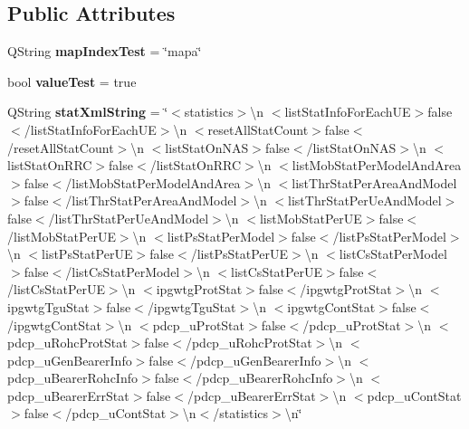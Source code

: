 \subsection*{Public Attributes}
\begin{DoxyCompactItemize}
\item 
Q\+String {\bfseries map\+Index\+Test} = \char`\"{}mapa\char`\"{}\hypertarget{class_statistics_data___test_adbae3b9a2fd94b1ab586481e3c0a6aac}{}\label{class_statistics_data___test_adbae3b9a2fd94b1ab586481e3c0a6aac}

\item 
bool {\bfseries value\+Test} = true\hypertarget{class_statistics_data___test_a870affc76bc0dce658c9f1118371ac86}{}\label{class_statistics_data___test_a870affc76bc0dce658c9f1118371ac86}

\item 
Q\+String {\bfseries stat\+Xml\+String} = \char`\"{}$<$statistics$>$\textbackslash{}n $<$list\+Stat\+Info\+For\+Each\+UE$>$false$<$/list\+Stat\+Info\+For\+Each\+UE$>$\textbackslash{}n $<$reset\+All\+Stat\+Count$>$false$<$/reset\+All\+Stat\+Count$>$\textbackslash{}n $<$list\+Stat\+On\+N\+AS$>$false$<$/list\+Stat\+On\+N\+AS$>$\textbackslash{}n $<$list\+Stat\+On\+R\+RC$>$false$<$/list\+Stat\+On\+R\+RC$>$\textbackslash{}n $<$list\+Mob\+Stat\+Per\+Model\+And\+Area$>$false$<$/list\+Mob\+Stat\+Per\+Model\+And\+Area$>$\textbackslash{}n $<$list\+Thr\+Stat\+Per\+Area\+And\+Model$>$false$<$/list\+Thr\+Stat\+Per\+Area\+And\+Model$>$\textbackslash{}n $<$list\+Thr\+Stat\+Per\+Ue\+And\+Model$>$false$<$/list\+Thr\+Stat\+Per\+Ue\+And\+Model$>$\textbackslash{}n $<$list\+Mob\+Stat\+Per\+UE$>$false$<$/list\+Mob\+Stat\+Per\+UE$>$\textbackslash{}n $<$list\+Ps\+Stat\+Per\+Model$>$false$<$/list\+Ps\+Stat\+Per\+Model$>$\textbackslash{}n $<$list\+Ps\+Stat\+Per\+UE$>$false$<$/list\+Ps\+Stat\+Per\+UE$>$\textbackslash{}n $<$list\+Cs\+Stat\+Per\+Model$>$false$<$/list\+Cs\+Stat\+Per\+Model$>$\textbackslash{}n $<$list\+Cs\+Stat\+Per\+UE$>$false$<$/list\+Cs\+Stat\+Per\+UE$>$\textbackslash{}n $<$ipgwtg\+Prot\+Stat$>$false$<$/ipgwtg\+Prot\+Stat$>$\textbackslash{}n $<$ipgwtg\+Tgu\+Stat$>$false$<$/ipgwtg\+Tgu\+Stat$>$\textbackslash{}n $<$ipgwtg\+Cont\+Stat$>$false$<$/ipgwtg\+Cont\+Stat$>$\textbackslash{}n $<$pdcp\+\_\+u\+Prot\+Stat$>$false$<$/pdcp\+\_\+u\+Prot\+Stat$>$\textbackslash{}n $<$pdcp\+\_\+u\+Rohc\+Prot\+Stat$>$false$<$/pdcp\+\_\+u\+Rohc\+Prot\+Stat$>$\textbackslash{}n $<$pdcp\+\_\+u\+Gen\+Bearer\+Info$>$false$<$/pdcp\+\_\+u\+Gen\+Bearer\+Info$>$\textbackslash{}n $<$pdcp\+\_\+u\+Bearer\+Rohc\+Info$>$false$<$/pdcp\+\_\+u\+Bearer\+Rohc\+Info$>$\textbackslash{}n $<$pdcp\+\_\+u\+Bearer\+Err\+Stat$>$false$<$/pdcp\+\_\+u\+Bearer\+Err\+Stat$>$\textbackslash{}n $<$pdcp\+\_\+u\+Cont\+Stat$>$false$<$/pdcp\+\_\+u\+Cont\+Stat$>$\textbackslash{}n$<$/statistics$>$\textbackslash{}n\char`\"{}\hypertarget{class_statistics_data___test_a11938d3afbe423297997695db2e79f29}{}\label{class_statistics_data___test_a11938d3afbe423297997695db2e79f29}


\end{DoxyCompactItemize}
